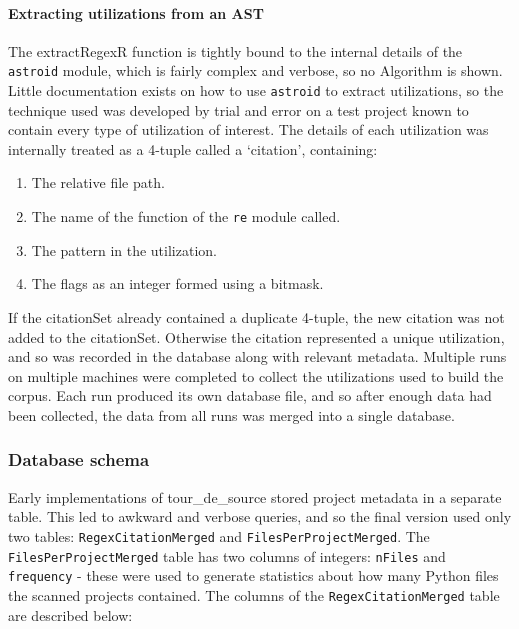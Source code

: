 \paragraph{Extracting utilizations from an AST}  The extractRegexR function is tightly bound to the internal details of the {\tt astroid} module, which is fairly complex and verbose, so no Algorithm is shown.  Little documentation exists on how to use {\tt astroid} to extract utilizations, so the technique used was developed by trial and error on a test project known to contain every type of utilization of interest.  The details of each utilization was internally treated as a 4-tuple called a `citation', containing:
\begin{enumerate} \itemsep -1pt
\item The relative file path.
\item The name of the function of the {\tt re} module called.
\item The pattern in the utilization.
\item The flags as an integer formed using a bitmask.
\end{enumerate}
If the citationSet already contained a duplicate 4-tuple, the new citation was not added to the citationSet.  Otherwise the citation represented a unique utilization, and so was recorded in the database along with relevant metadata.  Multiple runs on multiple machines were completed to collect the utilizations used to build the corpus.  Each run produced its own database file, and so after enough data had been collected, the data from all runs was merged into a single database.

\subsubsection{Database schema}
Early implementations of tour\_de\_source stored project metadata in a separate table.  This led to awkward and verbose queries, and so the final version used only two tables: {\tt RegexCitationMerged} and {\tt FilesPerProjectMerged}.  The {\tt FilesPerProjectMerged} table has two columns of integers: {\tt nFiles} and {\tt frequency} - these were used to generate statistics about how many Python files the scanned projects contained.  The columns of the {\tt RegexCitationMerged} table are described below:

